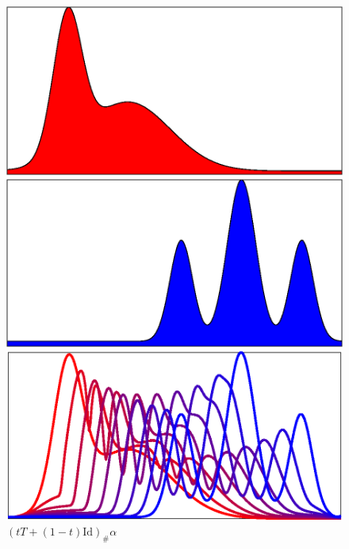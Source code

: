 \documentclass[cn,10pt,math=newtx,citestyle=gb7714-2015,bibstyle=gb7714-2015]{elegantbook}
\begin{document}
\vspace{1.5em}

\begin{figure}[H]
	\centering
	\begin{minipage}{0.33\linewidth}
		\centering
		\includegraphics[width=0.95\linewidth]{figure/fig2.11/input-mu.eps}
		\caption*{$\alpha$}
	\end{minipage}
	\begin{minipage}{0.33\linewidth}
		\centering
		\includegraphics[width=0.95\linewidth]{figure/fig2.11/input-nu.eps}
		\caption*{$\beta$}
	\end{minipage}
	\begin{minipage}{0.33\linewidth}
		\centering
		\includegraphics[width=0.95\linewidth]{figure/fig2.11/interp-bary.eps}
		\caption*{$(tT+(1-t)\text{Id})_\#\alpha$}
	\end{minipage}
	\vspace{1em}
	

\end{figure}
\end{document}
